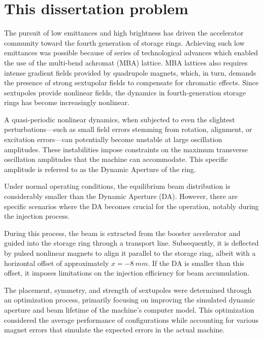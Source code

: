 

\section{This dissertation problem}
The pursuit of low emittances and high brightness has driven the accelerator community toward the fourth generation of storage rings. Achieving such low emittances was possible because of series of technological advances which enabled the use of the multi-bend achromat (MBA) lattice. MBA lattices also requires intense gradient fields provided by quadrupole magnets, which, in turn, demands the presence of strong sextupolar fields to compensate for chromatic effects. Since sextupoles provide nonlinear fields, the dynamics in fourth-generation storage rings has become increasingly nonlinear.

A quasi-periodic nonlinear dynamics, when subjected to even the slightest perturbations—such as small field errors stemming from rotation, alignment, or excitation errors—can potentially become unstable at large oscillation amplitudes. These instabilities impose constraints on the maximum transverse oscillation amplitudes that the machine can accommodate. This specific amplitude is referred to as the Dynamic Aperture of the ring.

Under normal operating conditions, the equilibrium beam distribution is considerably smaller than the Dynamic Aperture (DA). However, there are specific scenarios where the DA becomes crucial for the operation, notably during the injection process.

During this process, the beam is extracted from the booster accelerator and guided into the storage ring through a transport line. Subsequently, it is deflected by pulsed nonlinear magnets to align it parallel to the storage ring, albeit with a horizontal offset of approximately $x=-8~\unit{mm}$. If the DA is smaller than this offset, it imposes limitations on the injection efficiency for beam accumulation.

The placement, symmetry, and strength of sextupoles were determined through an optimization process, primarily focusing on improving the simulated dynamic aperture and beam lifetime of the machine's computer model. This optimization considered the average performance of configurations while accounting for various magnet errors that simulate the expected errors in the actual machine.

